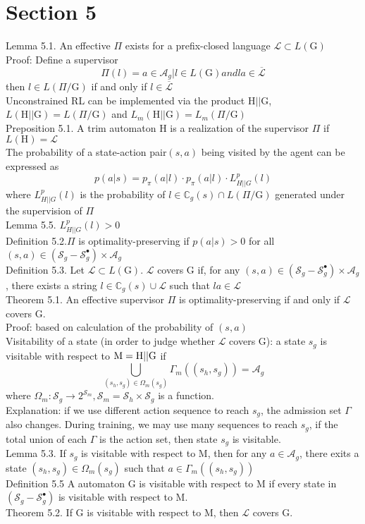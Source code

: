\documentclass{article}
\begin{document}
\section{Section 5}
Lemma 5.1. An effective $\Pi$ exists for a prefix-closed language $\mathcal{L}\subset L(\mathrm{G})$\\
Proof:
Define a supervisor 
$$\Pi(l)=a\in\mathcal{A}_g|l\in L(\mathrm{G}) {and} la\in\overline{\mathcal{L}}$$
then $l\in L(\Pi/\mathrm{G})$ if and only if $l\in\overline{\mathcal{L}}$\\
Unconstrained RL can be implemented via the product $\mathrm{H}||\mathrm{G}$, $L(\mathrm{H}||\mathrm{G})=L(\Pi/\mathrm{G})$ and $L_m(\mathrm{H}||\mathrm{G})=L_m(\Pi/\mathrm{G})$ \\
Preposition 5.1. A trim automaton H is a realization of the supervisor $\Pi$ if $L(\mathrm{H}) = \mathcal{L}$\\
The probability of a state-action pair$(s,a)$ being visited by the agent can be expressed as
$$
p(a|s)=p_{\pi}(a|l)\cdot p_{\pi}(a|l)\cdot L_{{H||G}}^{p}(l)
$$
where $L_{{H||G}}^{p}(l)$ is the probability of $l\in\mathbb{C}_g(s)\cap L(\Pi/\mathrm{G})$ generated under the supervision of $\Pi$\\
Lemma 5.5. $L_{{H||G}}^{p}(l)>0$\\
Definition 5.2.$\Pi$ is optimality-preserving if $p(a|s)>0$ for all $(s,a)\in(\mathcal{S}_g-\mathcal{S}_g^{\bullet})\times \mathcal{A}_g$\\
Definition 5.3. Let $\mathcal{L} \subset L(\mathrm{G})$. $\mathcal{L}$ covers G if, for any $(s,a)\in(\mathcal{S}_g-\mathcal{S}_g^{\bullet})\times \mathcal{A}_g$, there exists a string $l\in \mathbb{C}_g(s)\cup \mathcal{L}$ such that $la\in \mathcal{L}$\\
Theorem 5.1. An effective supervisor $\Pi$ is optimality-preserving if and only if $\mathcal{L}$ covers G.\\
Proof: based on calculation of the probability of $(s,a)$\\
Visitability of a state (in order to judge whether $\mathcal{L}$ covers $\mathrm{G}$): a state $s_g$ is visitable with respect to $\rm{} M=H||G$ if
$$
\bigcup_{(s_h,s_g)\in\Omega_m(s_g)}\Gamma_m((s_h,s_g))=\mathcal{A}_g
$$
where $\Omega_m:\mathcal{S}_g \rightarrow 2^{\mathcal{S}_m}, \mathcal{S}_m=\mathcal{S}_h \times \mathcal{S}_g$ is a function. \\
Explanation: if we use different action sequence to reach $s_g$, the admission set $\Gamma$ also changes. During training, we may use many sequences to reach $s_g$, if the total union of each $\Gamma$ is the action set, then state $s_g$ is visitable.\\
Lemma 5.3. If $s_g$ is visitable with respect to M, then for any $a\in\mathcal{A}_g$, there exits a state $(s_h,s_g) \in \Omega_{m}(s_g)$ such that $a\in \Gamma_m((s_h,s_g))$\\
Definition 5.5 A automaton G is visitable with respect to M if every state in $(\mathcal{S}_g-\mathcal{S}_g^{\bullet})$ is visitable with respect to M.\\
Theorem 5.2. If G is visitable with respect to M, then $\mathcal{L}$ covers G.\\
\end{document}
